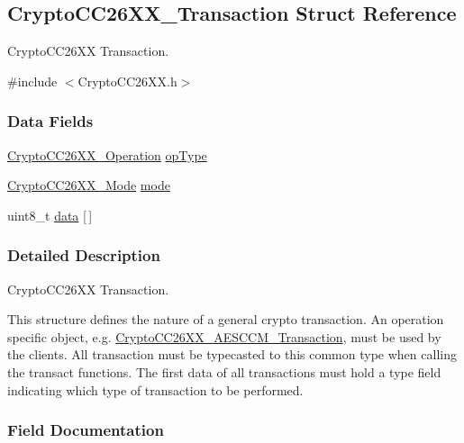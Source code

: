 \subsection{Crypto\+C\+C26\+X\+X\+\_\+\+Transaction Struct Reference}
\label{struct_crypto_c_c26_x_x___transaction}


Crypto\+C\+C26\+X\+X Transaction.  




{\ttfamily \#include $<$Crypto\+C\+C26\+X\+X.\+h$>$}

\subsubsection*{Data Fields}
\begin{DoxyCompactItemize}
\item 
\hyperlink{_crypto_c_c26_x_x_8h_a28465385e5b45efecc00f2015605f970}{Crypto\+C\+C26\+X\+X\+\_\+\+Operation} \hyperlink{struct_crypto_c_c26_x_x___transaction_a40fe1424c6534f76622ff56ed4f2ab42}{op\+Type}
\item 
\hyperlink{_crypto_c_c26_x_x_8h_abf86c8ac428559f00fed3299d439e2cd}{Crypto\+C\+C26\+X\+X\+\_\+\+Mode} \hyperlink{struct_crypto_c_c26_x_x___transaction_afe088678af719e3dc46c3196334b9398}{mode}
\item 
uint8\+\_\+t \hyperlink{struct_crypto_c_c26_x_x___transaction_a3eb99656cb17d1c68fc28d42b5b392dd}{data} \mbox{[}$\,$\mbox{]}
\end{DoxyCompactItemize}


\subsubsection{Detailed Description}
Crypto\+C\+C26\+X\+X Transaction. 

This structure defines the nature of a general crypto transaction. An operation specific object, e.\+g. \hyperlink{struct_crypto_c_c26_x_x___a_e_s_c_c_m___transaction}{Crypto\+C\+C26\+X\+X\+\_\+\+A\+E\+S\+C\+C\+M\+\_\+\+Transaction}, must be used by the clients. All transaction must be typecasted to this common type when calling the transact functions. The first data of all transactions must hold a type field indicating which type of transaction to be performed. 

\subsubsection{Field Documentation}
